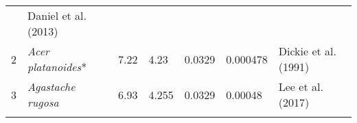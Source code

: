 \documentclass[]{article}
\begin{document}
\begin{longtable}[]{@{}lllllll@{}}
\begin{minipage}[t]{0.08\columnwidth}
\end{minipage} & \begin{minipage}[t]{0.23\columnwidth}\raggedright
Daniel et al. (2013)\strut
\end{minipage}\tabularnewline
\begin{minipage}[t]{0.05\columnwidth}\raggedright
2\strut
\end{minipage} & \begin{minipage}[t]{0.23\columnwidth}\raggedright
\emph{Acer platanoides}*\strut
\end{minipage} & \begin{minipage}[t]{0.05\columnwidth}\raggedright
7.22\strut
\end{minipage} & \begin{minipage}[t]{0.08\columnwidth}\raggedright
4.23\strut
\end{minipage} & \begin{minipage}[t]{0.08\columnwidth}\raggedright
0.0329\strut
\end{minipage} & \begin{minipage}[t]{0.08\columnwidth}\raggedright
0.000478\strut
\end{minipage} & \begin{minipage}[t]{0.23\columnwidth}\raggedright
Dickie et al. (1991)\strut
\end{minipage}\tabularnewline
\begin{minipage}[t]{0.05\columnwidth}\raggedright
3\strut
\end{minipage} & \begin{minipage}[t]{0.23\columnwidth}\raggedright
\emph{Agastache rugosa}\strut
\end{minipage} & \begin{minipage}[t]{0.05\columnwidth}\raggedright
6.93\strut
\end{minipage} & \begin{minipage}[t]{0.08\columnwidth}\raggedright
4.255\strut
\end{minipage} & \begin{minipage}[t]{0.08\columnwidth}\raggedright
0.0329\strut
\end{minipage} & \begin{minipage}[t]{0.08\columnwidth}\raggedright
0.00048\strut
\end{minipage} & \begin{minipage}[t]{0.23\columnwidth}\raggedright
Lee et al. (2017)\strut
\end{minipage}\tabularnewline
\begin{minipage}[t]{0.05\columnwidth}\raggedright

\end{minipage}
\end{longtable}
\end{document}

